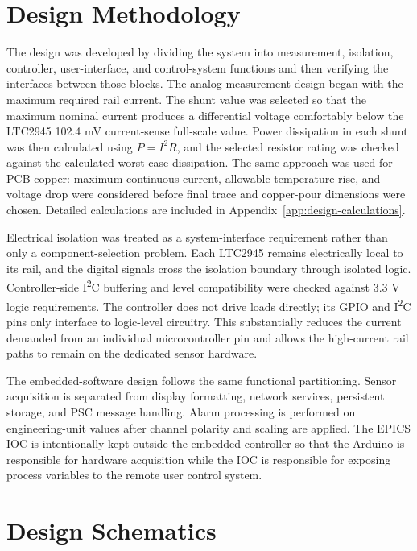 \section{Design Methodology}
The design was developed by dividing the system into measurement, isolation,
controller, user-interface, and control-system functions and then verifying the
interfaces between those blocks. The analog measurement design began with the
maximum required rail current. The shunt value was selected so that the maximum
nominal current produces a differential voltage comfortably below the LTC2945
102.4 mV current-sense full-scale value. Power dissipation in each shunt was
then calculated using \(P=I^2R\), and the selected resistor rating was checked
against the calculated worst-case dissipation. The same approach was used for
PCB copper: maximum continuous current, allowable temperature rise, and voltage
drop were considered before final trace and copper-pour dimensions were chosen.
Detailed calculations are included in Appendix~\ref{app:design-calculations}.

Electrical isolation was treated as a system-interface requirement rather than
only a component-selection problem. Each LTC2945 remains electrically local to
its rail, and the digital signals cross the isolation boundary through isolated
logic. Controller-side I\textsuperscript{2}C buffering and level compatibility
were checked against 3.3 V logic requirements. The controller does not drive
loads directly; its GPIO and I\textsuperscript{2}C pins only interface to
logic-level circuitry. This substantially reduces the current demanded from an
individual microcontroller pin and allows the high-current rail paths to remain
on the dedicated sensor hardware.

The embedded-software design follows the same functional partitioning. Sensor
acquisition is separated from display formatting, network services, persistent
storage, and PSC message handling. Alarm processing is performed on engineering-unit values after
channel polarity and scaling are applied. The EPICS IOC is intentionally kept
outside the embedded controller so that the Arduino is responsible for hardware
acquisition while the IOC is responsible for exposing process variables to the remote user control system.

\section{Design Schematics}
\label{sec:prelim-schematics}

